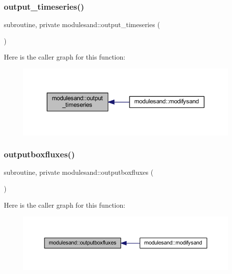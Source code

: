 \subsubsection{\texorpdfstring{output\+\_\+timeseries()}{output\_timeseries()}}
{\footnotesize\ttfamily subroutine, private modulesand\+::output\+\_\+timeseries (\begin{DoxyParamCaption}{ }\end{DoxyParamCaption})\hspace{0.3cm}{\ttfamily [private]}}

Here is the caller graph for this function\+:\nopagebreak
\begin{figure}[H]
\begin{center}
\leavevmode
\includegraphics[width=343pt]{namespacemodulesand_a88edcbeb020c6e5308ed19af4b7d4d46_icgraph}
\end{center}
\end{figure}
\mbox{\label{namespacemodulesand_a587b88656b78d72a4c1f4bfedcf366c3}} 
\subsubsection{\texorpdfstring{outputboxfluxes()}{outputboxfluxes()}}
{\footnotesize\ttfamily subroutine, private modulesand\+::outputboxfluxes (\begin{DoxyParamCaption}{ }\end{DoxyParamCaption})\hspace{0.3cm}{\ttfamily [private]}}

Here is the caller graph for this function\+:\nopagebreak
\begin{figure}[H]
\begin{center}
\leavevmode
\includegraphics[width=350pt]{namespacemodulesand_a587b88656b78d72a4c1f4bfedcf366c3_icgraph}
\end{center}
\end{figure}
\mbox{\label{namespacemodulesand_af453c334bacf72e34c80ff7d4a71fb1a}} 
